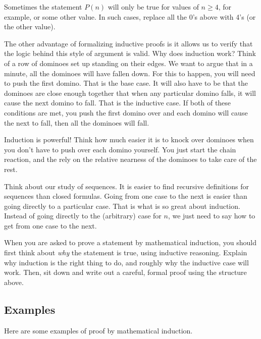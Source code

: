 \documentclass[12pt]{article}
\begin{document}
Sometimes the statement $P(n)$ will only be true for values of $n \ge 4$, for example, or some other value.  In such cases, replace all the 0's above with 4's (or the other value).

The other advantage of formalizing inductive proofs is it allows us to verify that the logic behind this style of argument is valid.  Why does induction work?  Think of a row of dominoes set up standing on their edges.  We want to argue that in a minute, all the dominoes will have fallen down.  For this to happen, you will need to push the first domino.  That is the base case.  It will also have to be that the dominoes are close enough together that when any particular domino falls, it will cause the next domino to fall.  That is the inductive case.  If both of these conditions are met, you push the first domino over and each domino will cause the next to fall, then all the dominoes will fall.

Induction is powerful!  Think how much easier it is to knock over dominoes when you don't have to push over each domino yourself.  You just start the chain reaction, and the rely on the relative nearness of the dominoes to take care of the rest.

Think about our study of sequences.  It is easier to find recursive definitions for sequences than closed formulas.  Going from one case to the next is easier than going directly to a particular case.  That is what is so great about induction.  Instead of going directly to the (arbitrary) case for $n$, we just need to say how to get from one case to the next.

When you are asked to prove a statement by mathematical induction, you should first think about {\em why} the statement is true, using inductive reasoning.  Explain why induction is the right thing to do, and roughly why the inductive case will work.  Then, sit down and write out a careful, formal proof using the structure above.

\subsection{Examples}

Here are some examples of proof by mathematical induction.
\end{document}
